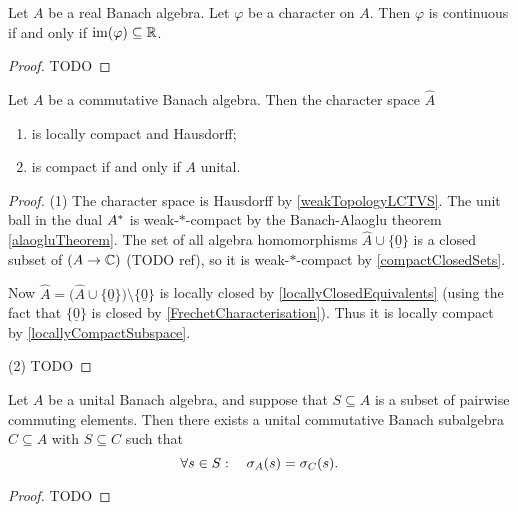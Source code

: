 \begin{lemma}
Let $A$ be a real Banach algebra. Let $\varphi$ be a character on $A$. Then $\varphi$ is continuous \textup{if and only if} $\operatorname{im}(\varphi)\subseteq \mathbb{R}$.
\end{lemma}
\begin{proof}
TODO
\end{proof}

\begin{proposition}
Let $A$ be a commutative Banach algebra. Then the character space $\hat{A}$
\begin{enumerate}
\item is locally compact and Hausdorff;
\item is compact if and only if $A$ unital.
\end{enumerate}
\end{proposition}
\begin{proof}
(1) The character space is Hausdorff by \ref{weakTopologyLCTVS}. The unit ball in the dual ${A}^*$ is weak-$*$-compact by the Banach-Alaoglu theorem \ref{alaogluTheorem}. The set of all algebra homomorphisms $\hat{A}\cup \{\underline{0}\}$ is a closed subset of $(A\to \mathbb{C})$ (TODO ref), so it is weak-$*$-compact by \ref{compactClosedSets}.

Now $\hat{A} = \big(\hat{A}\cup \{\underline{0}\}\big)\setminus \{\underline{0}\}$ is locally closed by \ref{locallyClosedEquivalents} (using the fact that $\{\underline{0}\}$ is closed by \ref{FrechetCharacterisation}). Thus it is locally compact by \ref{locallyCompactSubspace}.

(2) TODO
\end{proof}

\begin{proposition} \label{commutativeSameSpectrum}
Let $A$ be  a  unital  Banach  algebra,  and  suppose  that $S\subseteq A$ is a subset  of  pairwise commuting elements.  Then there exists a unital commutative Banach subalgebra $C\subseteq A$ with $S\subseteq C$ such that
\[ \forall s\in S: \quad \sigma_A(s) = \sigma_C(s). \]
\end{proposition}
\begin{proof}
TODO
\end{proof}

